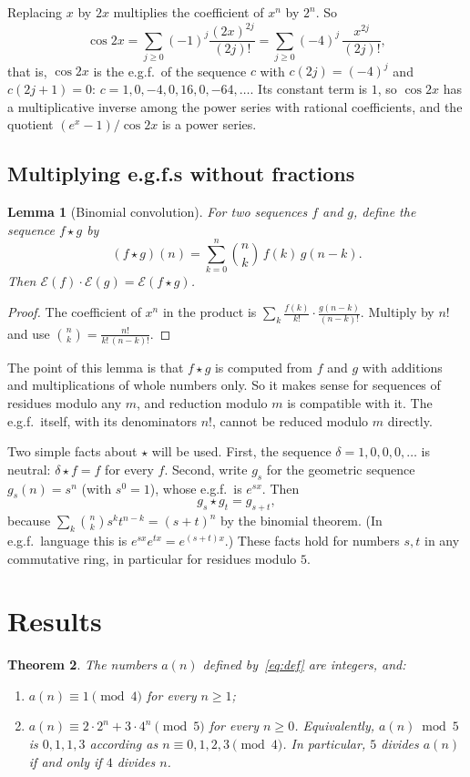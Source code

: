 \documentclass[11pt,a4paper]{article}
\newtheorem{theorem}{Theorem}[section]
\newtheorem{lemma}[theorem]{Lemma}
\theoremstyle{definition}
\theoremstyle{remark}
\begin{document}
Replacing $x$ by $2x$ multiplies the coefficient of $x^n$ by $2^n$. So
\[
\cos2x=\sum_{j\ge0}(-1)^j\frac{(2x)^{2j}}{(2j)!}=\sum_{j\ge0}(-4)^j\,\frac{x^{2j}}{(2j)!},
\]
that is, $\cos 2x$ is the e.g.f.\ of the sequence $c$ with $c(2j)=(-4)^j$ and $c(2j+1)=0$:
$c=1,0,-4,0,16,0,-64,\dots$. Its constant term is $1$, so $\cos2x$ has a multiplicative inverse among the power series
with rational coefficients, and the quotient $(e^x-1)/\cos2x$ is a power series.

\subsection{Multiplying e.g.f.s without fractions}
\begin{lemma}[Binomial convolution]\label{lem:conv}
For two sequences $f$ and $g$, define the sequence $f\star g$ by
\[
(f\star g)(n)=\sum_{k=0}^{n}\binom nk\,f(k)\,g(n-k).
\]
Then $\mathcal E(f)\cdot\mathcal E(g)=\mathcal E(f\star g)$.
\end{lemma}

\begin{proof}
The coefficient of $x^n$ in the product is $\sum_k\frac{f(k)}{k!}\cdot\frac{g(n-k)}{(n-k)!}$. Multiply by $n!$ and use
$\binom nk=\frac{n!}{k!\,(n-k)!}$.
\end{proof}

The point of this lemma is that $f\star g$ is computed from $f$ and $g$ with additions and multiplications of whole
numbers only. So it makes sense for sequences of residues modulo any $m$, and reduction modulo $m$ is compatible with
it. The e.g.f.\ itself, with its denominators $n!$, cannot be reduced modulo $m$ directly.

Two simple facts about $\star$ will be used. First, the sequence $\delta=1,0,0,0,\dots$ is neutral:
$\delta\star f=f$ for every $f$. Second, write $g_s$ for the geometric sequence $g_s(n)=s^n$ (with $s^0=1$), whose e.g.f.\ is $e^{sx}$. Then
\[
g_s\star g_t=g_{s+t},
\]
because $\sum_k\binom nks^kt^{n-k}=(s+t)^n$ by the binomial theorem. (In e.g.f.\ language this is $e^{sx}e^{tx}=e^{(s+t)x}$.)
These facts hold for numbers $s,t$ in any commutative ring, in particular for residues modulo $5$.

\section{Results}\label{sec:results}

\begin{theorem}\label{thm:main}
The numbers $a(n)$ defined by~\eqref{eq:def} are integers, and:
\begin{enumerate}[label=(\alph*)]
\item $a(n)\equiv1\pmod4$ for every $n\ge1$;
\item $a(n)\equiv2\cdot2^n+3\cdot4^n\pmod5$ for every $n\ge0$. Equivalently, $a(n)\bmod5$ is $0,1,1,3$ according as
$n\equiv0,1,2,3\pmod4$. In particular, $5$ divides $a(n)$ if and only if $4$ divides $n$.
\end{enumerate}
\end{theorem}
\end{document}

